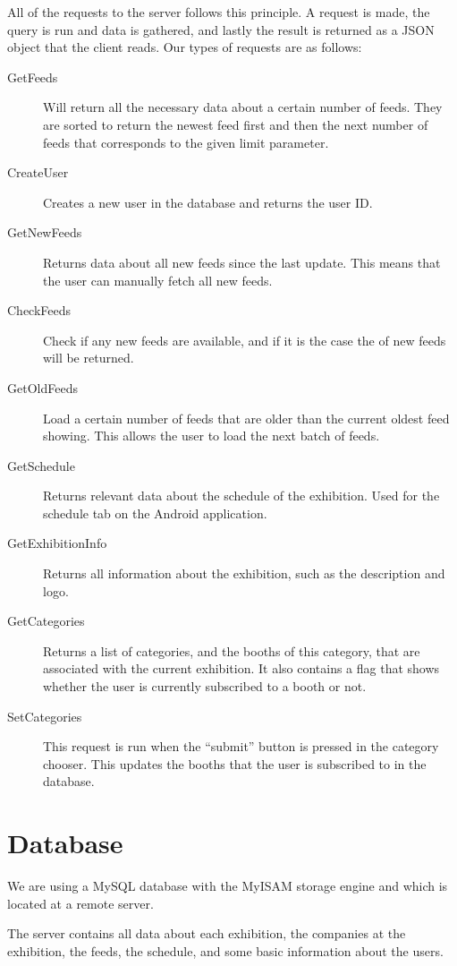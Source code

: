 All of the requests to the server follows this principle. A request is made, the query is run and data is gathered, and lastly the result is returned as a JSON object that the client reads. Our types of requests are as follows:
\begin{description}
\item[GetFeeds] Will return all the necessary data about a certain number of feeds. They are sorted to return the newest feed first and then the next number of feeds that corresponds to the given limit parameter.
\item[CreateUser] Creates a new user in the database and returns the user ID.
\item[GetNewFeeds] Returns data about all new feeds since the last update. This means that the user can manually fetch all new feeds.
\item[CheckFeeds] Check if any new feeds are available, and if it is the case the of new feeds will be returned.
\item[GetOldFeeds] Load a certain number of feeds that are older than the current oldest feed showing. This allows the user to load the next batch of feeds.
\item[GetSchedule] Returns relevant data about the schedule of the exhibition. Used for the schedule tab on the Android application.
\item[GetExhibitionInfo] Returns all information about the exhibition, such as the description and logo.
\item[GetCategories] Returns a list of categories, and the booths of this category, that are associated with the current exhibition. It also contains a flag that shows whether the user is currently subscribed to a booth or not.
\item[SetCategories] This request is run when the ``submit'' button is pressed in the category chooser. This updates the booths that the user is subscribed to in the database.
\end{description}

\section{Database}
We are using a MySQL database with the MyISAM storage engine and which is located at a remote server.

The server contains all data about each exhibition, the companies at the exhibition, the feeds, the schedule, and some basic information about the users.

